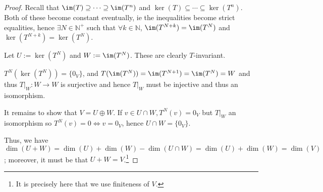 \begin{proof}
    Recall that $\im(T) \supseteq \cdots \supseteq \im(T^n)$ and $\ker(T) \subseteq \cdots \subseteq \ker(T^n)$. Both of these become constant eventually, ie the inequalities become strict equalities, hence $\exists N \in \mathbb{N}^+$ such that $\forall k \in \mathbb{N}$, $\im(T^{N+k}) = \im(T^N)$ and $\ker(T^{N+k}) = \ker(T^{N})$.

    Let $U := \ker(T^N)$ and $W := \im(T^N)$. These are clearly $T$-invariant. 

    $T^N(\ker(T^N)) = \{0_V\}$, and $T(\im(T^N)) = \im(T^{N+1}) =\im(T^N) = W$ and thus $T\vert_W : W \to W$ is surjective and hence $T\vert_W$ must be injective and thus an isomorphism.

    It remains to show that $V = U \oplus W$. If $v \in U \cap W, T^N(v) = 0_V$ but $T\vert_W$ an isomorphism so $T^N(v) = 0 \iff v = 0_V$, hence $U \cap W = \{0_V\}$.

    Thus, we have $\dim(U + W) = \dim(U) + \dim(W) - \dim(U \cap W) = \dim(U) + \dim(W) = \dim(V)$; moreover, it must be that $U + W = V$.\footnote{It is precisely here that we use finiteness of $V$.}
\end{proof}